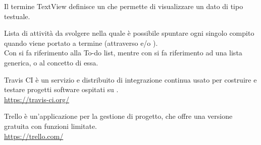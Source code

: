 Il termine TextView definisce un  che permette di visualizzare un dato di tipo testuale.

Lista di attività da svolgere nella quale è possibile spuntare ogni singolo compito quando viene portato a termine (attraverso  e/o ).\\
Con  si fa riferimento alla  To-do list, mentre con  si fa riferimento ad una lista generica, o al concetto di essa.

Travis CI è un servizio  e distribuito di integrazione continua usato per costruire e testare progetti software ospitati su .\\
\url{https://travis-ci.org/}

Trello è un’applicazione per la gestione di progetto, che offre una versione gratuita con funzioni limitate.\\
\url{https://trello.com/}
\clearpage
